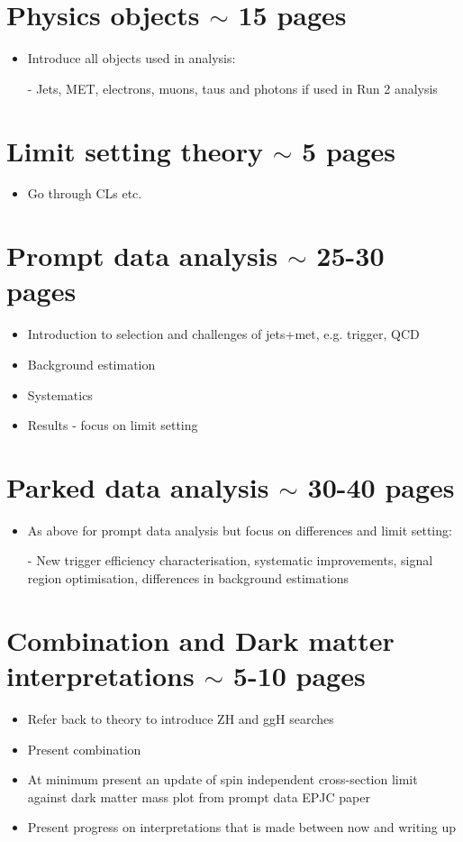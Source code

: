 \documentclass[12pt]{article}
\begin{document}
\section{Physics objects $\sim$ 15 pages}
\begin{itemize}
\label{sec:physobjects}
\item Introduce all objects used in analysis:
\item[-] Jets, MET, electrons, muons, taus and photons if used in Run 2 analysis
\end{itemize}

\section{Limit setting theory $\sim$ 5 pages}
\begin{itemize}
\label{sec:limits}
\item Go through CLs etc.
\end{itemize}

\section{Prompt data analysis $\sim$ 25-30 pages}
\begin{itemize}
\label{sec:promptana}
\item Introduction to selection and challenges of jets+met, e.g. trigger, QCD
\item Background estimation
\item Systematics
\item Results - focus on limit setting
\end{itemize}

\section{Parked data analysis $\sim$ 30-40 pages}
\begin{itemize}
\label{sec:parkedana}
\item As above for prompt data analysis but focus on differences and limit setting:
\item[-] New trigger efficiency characterisation, systematic improvements, signal region optimisation, differences in background estimations
\end{itemize}

\section{Combination and Dark matter interpretations $\sim$ 5-10 pages}
\begin{itemize}
\label{sec:interpretations}
\item Refer back to theory to introduce ZH and ggH searches
\item Present combination
\item At minimum present an update of spin independent cross-section limit against dark matter mass plot from prompt data EPJC paper
\item Present progress on interpretations that is made between now and writing up
\end{itemize}
\end{document}
